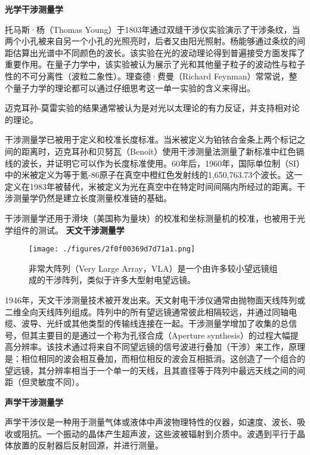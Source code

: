 \textbf{光学干涉测量学}

托马斯·杨（Thomas Young）于1803年通过双缝干涉仪实验演示了干涉条纹，当两个小孔被来自另一个小孔的光照亮时，后者又由阳光照射。杨能够通过条纹的间距估算出光谱中不同颜色的波长。该实验在光的波动理论得到普遍接受方面发挥了重要作用。在量子力学中，该实验被认为展示了光和其他量子粒子的波动性与粒子性的不可分离性（波粒二象性）。理查德·费曼（Richard Feynman）常常说，整个量子力学的理论都可以通过仔细思考这一单一实验的含义来得出。

迈克耳孙-莫雷实验的结果通常被认为是对光以太理论的有力反证，并支持相对论的理论。

干涉测量学已被用于定义和校准长度标准。当米被定义为铂铱合金条上两个标记之间的距离时，迈克耳孙和贝努瓦（Benoît）使用干涉测量法测量了新标准中红色镉线的波长，并证明它可以作为长度标准使用。60年后，1960年，国际单位制（SI）中的米被定义为等于氪-86原子在真空中橙红色发射线的1,650,763.73个波长。这一定义在1983年被替代，米被定义为光在真空中在特定时间间隔内所经过的距离。干涉测量学仍然是建立长度测量校准链的基础。

干涉测量学还用于滑块（美国称为量块）的校准和坐标测量机的校准，也被用于光学组件的测试。
\textbf{天文干涉测量学}
\begin{figure}[ht]
\centering
\texttt{[image: ./figures/2f0f00369d7d71a1.png]}
\caption{非常大阵列（Very Large Array，VLA）是一个由许多较小望远镜组成的干涉阵列，类似于许多大型射电望远镜。} \label{fig_GSWLX_11}
\end{figure}
1946年，天文干涉测量技术被开发出来。天文射电干涉仪通常由抛物面天线阵列或二维全向天线阵列组成。阵列中的所有望远镜通常彼此相隔较远，并通过同轴电缆、波导、光纤或其他类型的传输线连接在一起。干涉测量学增加了收集的总信号，但其主要目的是通过一个称为孔径合成（Aperture synthesis）的过程大幅提高分辨率。该技术通过将来自不同望远镜的信号波进行叠加（干涉）来工作，原理是：相位相同的波会相互叠加，而相位相反的波会互相抵消。这创造了一个组合的望远镜，其分辨率相当于一个单一的天线，且其直径等于阵列中最远天线之间的间距（但灵敏度不同）。

\textbf{声学干涉测量学}

声学干涉仪是一种用于测量气体或液体中声波物理特性的仪器，如速度、波长、吸收或阻抗。一个振动的晶体产生超声波，这些波被辐射到介质中。波遇到平行于晶体放置的反射器后反射回源，并进行测量。
